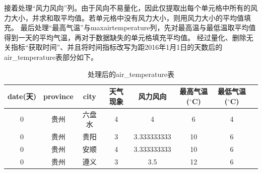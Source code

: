 \documentclass{cumcm}
\begin{document}
\begin{enumerate}
	接着处理“风力风向”列。由于风向不易量化，因此仅提取出每个单元格中所有的风力大小，并求和取平均值。若单元格中没有风力大小，则用风力大小的平均值填充。
	最后处理“最高气温”与maxairtemperature列，先对最高温与最低温取平均值得到一天的平均气温，再对于数据缺失的单元格填充平均值。
	经过量化、删除无关指标“获取时间”、并且将时间指标改写为距2016年1月1日的天数后的air\_temperature表部分如下。
	\begin{table}[H]
		\centering
		\caption{处理后的air\_temperature表} \label{air_temperature_processed}
		\begin{tabular*}{\textwidth}{cccccccc}
			\hline
			date(天) & province & city & 天气现象 & 风力风向 & 最高气温($^{\circ}$C) & 最低气温($^{\circ}$C)\\
			\hline
			0 & 贵州 & 六盘水 & 4 & 4 & 6 & 4\\
			0 & 贵州 & 贵阳 & 3 & 3.333333333 & 10 & 6\\
			0 & 贵州 & 安顺 & 4 & 3.333333333 & 10 & 6\\
			0 & 贵州 & 遵义 & 3 & 3.5 & 12 & 6\\
			\hline
		\end{tabular*}
	\end{table}


\end{enumerate}
\end{document}
